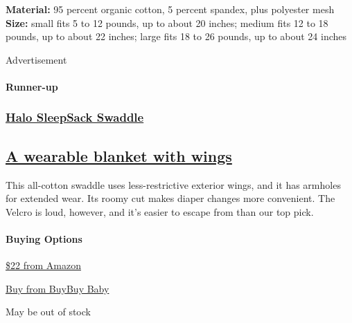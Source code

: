 \textbf{Material:} 95 percent organic cotton, 5 percent spandex, plus
polyester mesh\\
\textbf{Size:} small fits 5 to 12 pounds, up to about 20 inches; medium
fits 12 to 18 pounds, up to about 22 inches; large fits 18 to 26 pounds,
up to about 24 inches

Advertisement

\hypertarget{runner-up}{%
\paragraph{Runner-up}\label{runner-up}}

\href{https://www.nytimes3xbfgragh.onion/wirecutter/out/link/30687/150978/4/86633?merchant=Amazon}{}

\hypertarget{halo-sleepsack-swaddle}{%
\subsubsection{\texorpdfstring{\href{https://www.nytimes3xbfgragh.onion/wirecutter/out/link/30687/150978/4/86633?merchant=Amazon}{Halo
SleepSack
Swaddle}}{Halo SleepSack Swaddle}}\label{halo-sleepsack-swaddle}}

\hypertarget{a-wearable-blanket-with-wings}{%
\subsection{\texorpdfstring{\href{https://www.nytimes3xbfgragh.onion/wirecutter/out/link/30687/150978/4/86633?merchant=Amazon}{A
wearable blanket with
wings}}{A wearable blanket with wings}}\label{a-wearable-blanket-with-wings}}

This all-cotton swaddle uses less-restrictive exterior wings, and it has
armholes for extended wear. Its roomy cut makes diaper changes more
convenient. The Velcro is loud, however, and it's easier to escape from
than our top pick.

\hypertarget{buying-options-1}{%
\paragraph{Buying Options}\label{buying-options-1}}

\href{https://www.nytimes3xbfgragh.onion/wirecutter/out/link/30687/150978/4/86633?merchant=Amazon}{\$22
from Amazon}

\href{https://shop-links.co/1706409802203647217}{Buy from BuyBuy Baby}

May be out of stock

